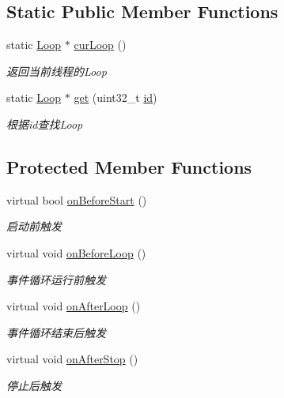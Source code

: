 \subsection*{Static Public Member Functions}
\begin{DoxyCompactItemize}
\item 
static \hyperlink{classec_1_1Loop}{Loop} $\ast$ \hyperlink{classec_1_1Loop_abb797bdabdefdff5b6cc3f2b1b249747}{cur\-Loop} ()
\begin{DoxyCompactList}\small\item\em 返回当前线程的\-Loop \end{DoxyCompactList}\item 
static \hyperlink{classec_1_1Loop}{Loop} $\ast$ \hyperlink{classec_1_1Loop_a459fada2bbc382637fab88b3ce914d46}{get} (uint32\-\_\-t \hyperlink{classec_1_1Loop_ae60730f9a1e07de6039de8008293769a}{id})
\begin{DoxyCompactList}\small\item\em 根据id查找\-Loop \end{DoxyCompactList}\end{DoxyCompactItemize}
\subsection*{Protected Member Functions}
\begin{DoxyCompactItemize}
\item 
virtual bool \hyperlink{classec_1_1Loop_ab09acf916e8d3ad94cc2ceb483b1cac6}{on\-Before\-Start} ()
\begin{DoxyCompactList}\small\item\em 启动前触发 \end{DoxyCompactList}\item 
virtual void \hyperlink{classec_1_1Loop_ab50d820e5c09ef53af2aa97a1912025a}{on\-Before\-Loop} ()
\begin{DoxyCompactList}\small\item\em 事件循环运行前触发 \end{DoxyCompactList}\item 
virtual void \hyperlink{classec_1_1Loop_a9d3fec1a0d05dfdb73ceee20b6fd55b0}{on\-After\-Loop} ()
\begin{DoxyCompactList}\small\item\em 事件循环结束后触发 \end{DoxyCompactList}\item 
virtual void \hyperlink{classec_1_1Loop_aa52a4ac0232b307a08e7857748ebdd3f}{on\-After\-Stop} ()
\begin{DoxyCompactList}\small\item\em 停止后触发 \end{DoxyCompactList}\end{DoxyCompactItemize}


